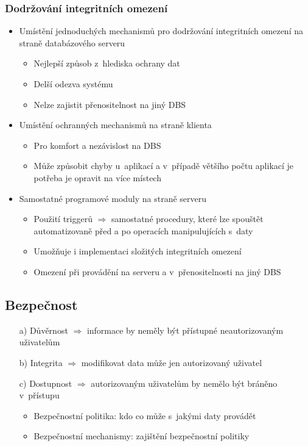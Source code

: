 \documentclass[a4paper,10pt]{article}
\newcommand{\tedy}{$\Rightarrow$ }
\begin{document}
      \subsubsection{Dodržování integritních omezení}
        \begin{itemize}
          \item Umístění jednoduchých mechanismů pro dodržování integritních omezení na straně databázového serveru
          \begin{itemize}
            \item Nejlepší způsob z~hlediska ochrany dat
            \item Delší odezva systému
            \item Nelze zajistit přenositelnost na jiný DBS
          \end{itemize}
          \item Umístění ochranných mechanismů na straně klienta
          \begin{itemize}
            \item Pro komfort a nezávislost na DBS
            \item Může způsobit chyby u~aplikací a v~případě většího počtu aplikací je potřeba je opravit na více místech
          \end{itemize}
          \item Samostatné programové moduly na straně serveru
          \begin{itemize}
            \item Použití triggerů \tedy samostatné procedury, které lze spouštět automatizovaně před a po operacích manipulujících s~daty
            \item Umožňuje i implementaci složitých integritních omezení
            \item Omezení při provádění na serveru a v~přenositelnosti na jiný DBS
          \end{itemize}
        \end{itemize}

    \subsection{Bezpečnost}
      \begin{itemize}
        \item[a)] Důvěrnost \tedy informace by neměly být přístupné neautorizovaným uživatelům
        \item[b)] Integrita \tedy modifikovat data může jen autorizovaný uživatel
        \item[c)] Dostupnost \tedy autorizovaným uživatelům by nemělo být bráněno v~přístupu
        \begin{itemize}
          \item Bezpečnostní politika: kdo co může s~jakými daty provádět
          \item Bezpečnostní mechanismy: zajištění bezpečnostní politiky
        \end{itemize}
      \end{itemize}
\end{document}
